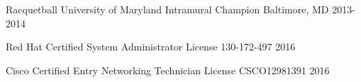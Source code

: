 

\begin{cvhonors}

  \cvhonor
    {Racquetball} %
    {University of Maryland Intramural Champion} %
    {Baltimore, MD} %
    {2013-2014} %


    \cvhonor
    {Red Hat Certified System Administrator}
    {License 130-172-497}
    {2016}

  \cvhonor
    {Cisco Certified Entry Networking Technician}
    {License CSCO12981391}
    {2016}

\end{cvhonors}

